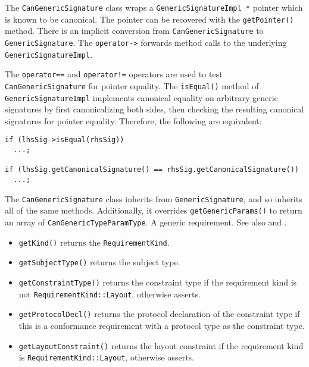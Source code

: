 \documentclass[../generics]{subfiles}
\begin{document}
The \texttt{CanGenericSignature} class wraps a \texttt{GenericSignatureImpl *} pointer which is known to be canonical. The pointer can be recovered with the \texttt{getPointer()} method. There is an implicit conversion from \texttt{CanGenericSignature} to \texttt{GenericSignature}. The \texttt{operator->} forwards method calls to the underlying \texttt{GenericSignatureImpl}.

The \texttt{operator==} and \texttt{operator!=} operators are used to test \texttt{CanGenericSignature} for pointer equality. The \texttt{isEqual()} method of \texttt{GenericSignatureImpl} implements canonical equality on arbitrary generic signatures by first canonicalizing both sides, then checking the resulting canonical signatures for pointer equality. Therefore, the following are equivalent:
\begin{Verbatim}
if (lhsSig->isEqual(rhsSig))
  ...;

if (lhsSig.getCanonicalSignature() == rhsSig.getCanonicalSignature())
  ...;
\end{Verbatim}
The \texttt{CanGenericSignature} class inherits from \texttt{GenericSignature}, and so inherits all of the same methods. Additionally, it overrides \texttt{getGenericParams()} to return an array of \texttt{CanGenericTypeParamType}.
A generic requirement. See also  and .
\begin{itemize}
\item \texttt{getKind()} returns the \texttt{RequirementKind}.
\item \texttt{getSubjectType()} returns the subject type.
\item \texttt{getConstraintType()} returns the constraint type if the requirement kind is not \texttt{RequirementKind::Layout}, otherwise asserts.
\item \texttt{getProtocolDecl()} returns the protocol declaration of the constraint type if this is a conformance requirement with a protocol type as the constraint type.
\item \texttt{getLayoutConstraint()} returns the layout constraint if the requirement kind is \texttt{RequirementKind::Layout}, otherwise asserts.
\end{itemize}
\end{document}
